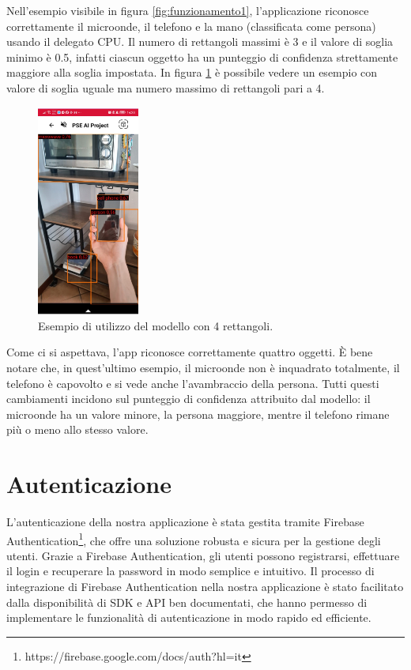 Nell’esempio visibile in figura \ref{fig:funzionamento1}, l’applicazione riconosce correttamente il microonde, il telefono e la mano (classificata come persona) usando il delegato CPU.
Il numero di rettangoli massimi è 3 e il valore di soglia minimo è 0.5, infatti ciascun oggetto ha un punteggio di confidenza strettamente maggiore alla
soglia impostata.
In figura \ref{fig:funzionamento2} è possibile vedere un esempio con valore di soglia uguale ma numero massimo di rettangoli pari a 4.

\begin{figure}[H]
    \centering
    \includegraphics[width=0.3\textwidth]{Immagini/App/funzionamento_4rettangoli.png}
    \caption{Esempio di utilizzo del modello con 4 rettangoli.}
    \label{fig:funzionamento2}
\end{figure}

Come ci si aspettava, l’app riconosce correttamente quattro oggetti.
È bene notare che, in quest’ultimo esempio, il microonde non è inquadrato totalmente, il telefono è capovolto e si vede anche l’avambraccio della persona.
Tutti questi cambiamenti incidono sul punteggio di confidenza attribuito dal modello: il microonde ha un valore minore, la persona maggiore,
mentre il telefono rimane più o meno allo stesso valore.

\section{Autenticazione}
L'autenticazione della nostra applicazione è stata gestita tramite Firebase Authentication\footnote{https://firebase.google.com/docs/auth?hl=it}, che
offre una soluzione robusta e sicura per la gestione degli utenti. Grazie a Firebase Authentication, gli utenti possono registrarsi, effettuare il login
e recuperare la password in modo semplice e intuitivo. Il processo di integrazione di Firebase Authentication nella nostra applicazione è stato facilitato
dalla disponibilità di SDK e API ben documentati, che hanno permesso di implementare le funzionalità di autenticazione in modo rapido ed efficiente.


